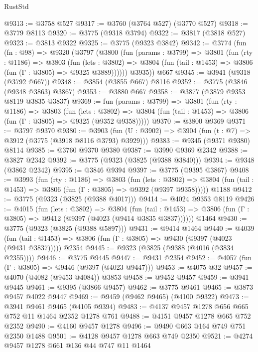 \begin{lexlean}{RustStd}
\begin{coremodule}
{\begin{coremodule}
{{{{{{{{{{{{{{{{{{{{{{{{{{{{{{{@9313 := @3758 @527
@9317 := @3760 (@3764 @527) (@3770 @527)
@9318 := @3779 @8113
@9320 := @3775 (@9318 @3794)
@9322 := @3817 (@3818 @527)
@9323 := @3813 @9322
@9325 := @3775 (@9323 @3842)
@9342 := @3774
    (fun (fn : @98) =>
    @9320
      (@3797
        (@3800
          (fun (params : @3799) =>
          @3801
            (fun (rty : @1186) =>
            @3803
              (fun (lets : @3802) =>
              @3804 (fun (tail : @1453) => @3806 (fun (Γ : @3805) => @9325 @3889))))))
        @3935))
    @667
@9345 := @3941 (@9318 (@3792 @667))
@9348 := @3854 (@3855 @667) @8116
@9352 := @3775 (@3846 (@9348 @3863) @3867)
@9353 := @3880 @667
@9358 := @3877 (@3879 @9353 @8119 @3835 @3837)
@9369 := fun (params : @3799) =>
  @3801
    (fun (rty : @1186) =>
    @3803
      (fun (lets : @3802) =>
      @3804 (fun (tail : @1453) => @3806 (fun (Γ : @3805) => @9325 (@9352 @9358)))))
@9370 := @3800 @9369
@9371 := @3797 @9370
@9380 := @3903 (fun (U : @3902) => @3904 (fun (t : @7) => @3912 (@3775 (@3918 @8116 @3793) @3929)))
@9383 := @9345 (@9371 @9380) @8114
@9385 := @3760 @9370 @9380
@9387 := @3990 @9369 @2342
@9388 := @3827 @2342
@9392 := @3775 (@9323 (@3825 (@9388 @3840)))
@9394 := @9348 (@3862 @2342)
@9395 := @3846 @9394
@9397 := @3775 (@9395 @3867)
@9408 := @3993
    (fun (rty : @1186) =>
    @3803
      (fun (lets : @3802) =>
      @3804 (fun (tail : @1453) => @3806 (fun (Γ : @3805) => @9392 (@9397 @9358)))))
    @1188
@9412 := @3775 (@9323 (@3825 (@9388 @4017)))
@9414 := @4024 @9353 @8119
@9426 := @4015
    (fun (lets : @3802) =>
    @3804
      (fun (tail : @1453) => @3806 (fun (Γ : @3805) => @9412 (@9397 (@4023 (@9414 @3835 @3837))))))
    @1464
@9430 := @3775 (@9323 (@3825 (@9388 @5897)))
@9431 := @9414 @1464
@9440 := @4039
    (fun (tail : @1453) => @3806 (fun (Γ : @3805) => @9430 (@9397 (@4023 (@9431 @3837)))))
    @2354
@9445 := @9323 (@3825 (@9388 (@4016 (@3834 @2355))))
@9446 := @3775 @9445
@9447 := @9431 @2354
@9452 := @4057 (fun (Γ : @3805) => @9446 (@9397 (@4023 @9447)))
@9453 := @4075 @32
@9457 := @4070 (@4082 (@9453 @4084)) @3853
@9458 := @9452 @9457
@9459 := @3941 @9445
@9461 := @9395 (@3866 @9457)
@9462 := @3775 @9461
@9465 := @3873 @9457 @4022 @9447
@9469 := @9459 (@9462 @9465) (@4100 @9322)
@9473 := @3941 @9461 @9465 (@4105 @9394)
@9483 := @4137 @9457 @1278 @656 @665 @752 @11 @1464 @2352 @1278 @761
@9488 := @4151 @9457 @1278 @665 @752 @2352
@9490 := @4160 @9457 @1278
@9496 := @9490 @663 @164 @749 @751 @2350 @1488
@9501 := @4128 @9457 @1278 @663 @749 @2350
@9521 := @4274
    @9457
    @1278
    @661
    @136
    @44
    @747
    @11
    @1464
}}}}}}}}}}}}}}}}}}}}}}}}}}}}}}}
\end{coremodule}}
\end{coremodule}
\end{lexlean}

